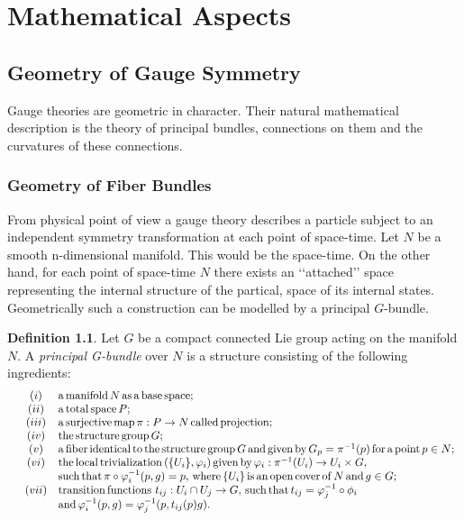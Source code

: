 \documentclass[11pt]{report}
\theoremstyle{plain}
\theoremstyle{definition}
\newtheorem{defn}[thm]{Definition}
\theoremstyle{remark}
\theoremstyle{remark}
\numberwithin{equation}{section}
\begin{document}
\chapter{Mathematical Aspects}


\section{Geometry of Gauge Symmetry}

Gauge theories are geometric in character. Their natural mathematical description is the theory of principal bundles, connections on them and the curvatures of these connections. 

\subsection{Geometry of Fiber Bundles}
From physical point of view a gauge theory describes a particle subject to an independent symmetry transformation at each point of space-time. Let $N$ be a smooth n-dimensional manifold. This would be the space-time. On the other hand, for each point of space-time $N$ there exists an \lq\lq{}attached\rq\rq{} space representing the internal structure of the partical, space of its internal states. Geometrically such a construction can be modelled by a principal $G$-bundle. 

\begin{defn}
Let $G$ be a compact connected Lie group acting on the manifold $N$. A \textit{principal G-bundle} over $N$ is a structure consisting of the following ingredients:
\[\begin{array}{lcl}
&(i)& {\rm a \, manifold} \, N \, {\rm as \, a \, base \, space;} \\
&(ii)& {\rm a \, total \, space} \, P; \\
&(iii)& {\rm a \, surjective \, map} \, \pi: P \to N \, {\rm called \, projection};\\
&(iv)& {\rm the \, structure \, group} \, G; \\
&(v)&{\rm a \, fiber \, identical \, to \, the \, structure \, group} \, G \, {\rm and \, given \, by} \, G_p = \pi^{-1}(p) \, {\rm for \, a \, point} \, p\in N;\\
&(vi)& {\rm the \, local \, trivialization} \, (\{U_i\}, \varphi_i) \, {\rm given \, by} \, \varphi_i: \pi^{-1}(U_i) \to U_i \times G, \\
& & {\rm such \, that} \, \pi \circ \varphi^{-1}_i(p, g) = p, \,  {\rm where} \, \{U_i\} \, {\rm is \, an \, open \, cover \, of} \, N \, {\rm and} \, g \in G;\\
&(vii)& {\rm transition \, functions} \, \, t_{ij}: U_i\cap U_j \to G, \, {\rm such \, that} \, t_{ij} = \varphi^{-1}_j\circ \phi_i \\
& & {\rm and} \, \varphi^{-1}_i(p, g) = \varphi^{-1}_j(p, t_{ij}(p)g).\\
\end{array}\]

\end{defn}
\end{document}

